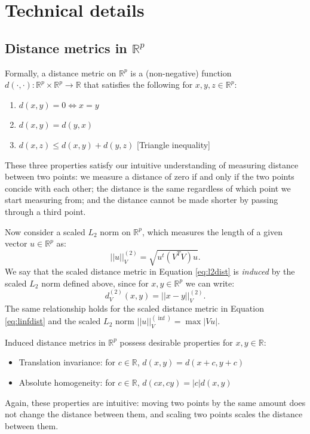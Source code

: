 \documentclass{article}
\newcommand{\R}{\mathbb{R}}
\newcommand{\Rp}{\mathbb{R}^p}
\begin{document}

\section{Technical details}

\subsection{Distance metrics in $\Rp$}
\label{app:distmetrics}

Formally, a distance metric on $\Rp$ is a (non-negative) function $d(\cdot, \cdot): \Rp \times \Rp \to \R$ that satisfies the following for $x,y,z \in \Rp$:
\begin{enumerate}
    \item $d(x,y) = 0 \iff x = y$
    \item $d(x,y) = d(y,x)$
    \item $d(x,z) \leq d(x,y) + d(y,z)$ [Triangle inequality]
\end{enumerate}
These three properties satisfy our intuitive understanding of measuring distance between two points: we measure a distance of zero if and only if the two points concide with each other; the distance is the same regardless of which point we start measuring from; and the distance cannot be made shorter by passing through a third point.

Now consider a scaled $L_2$ norm on $\Rp$, which measures the length of a given vector $u \in \Rp$ as:
$$||u||_V^{(2)} = \sqrt{u^t (V^T V) u}.$$
We say that the scaled distance metric in Equation \ref{eq:l2dist} is \textit{induced} by the scaled $L_2$ norm defined above, since for $x,y \in \Rp$ we can write:
$$d_V^{(2)}(x,y) = ||x - y||_V^{(2)}.$$
The same relationship holds for the scaled distance metric in Equation \ref{eq:linfdist} and the scaled $L_2$ norm $||u||_V^{(\inf)} = \max|Vu|.$

Induced distance metrics in $\Rp$ possess desirable properties for $x,y \in \R$:
\begin{itemize}
    \item Translation invariance: for $c \in \R$, $d(x,y) = d(x+c, y+c)$
    \item Absolute homogeneity: for $c \in \R$, $d(cx, cy) = |c| d(x,y)$
\end{itemize}
Again, these properties are intuitive: moving two points by the same amount does not change the distance between them, and scaling two points scales the distance between them.
\end{document}

